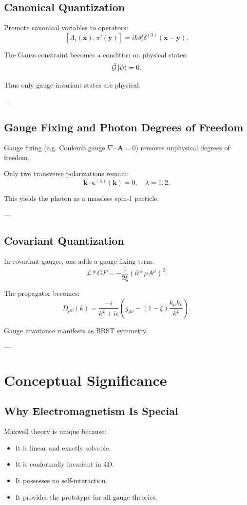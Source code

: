 \documentclass[12pt]{article}
\begin{document}
\subsection{Canonical Quantization}

Promote canonical variables to operators:
\[
[A_i(\mathbf{x}), \pi^j(\mathbf{y})]
= i\hbar \delta_i^j \delta^{(3)}(\mathbf{x}-\mathbf{y}).
\]

The Gauss constraint becomes a condition on physical states:
\[
\hat{\mathcal{G}} \ket{\psi} = 0.
\]

Thus only gauge-invariant states are physical.

---

\subsection{Gauge Fixing and Photon Degrees of Freedom}

Gauge fixing (e.g. Coulomb gauge $ \nabla \cdot \mathbf{A} = 0 $) removes unphysical degrees of freedom.

Only two transverse polarizations remain:
\[
\mathbf{k} \cdot \boldsymbol{\epsilon}^{(\lambda)}(\mathbf{k}) = 0,
\quad \lambda = 1,2.
\]

This yields the photon as a massless spin-1 particle.

---

\subsection{Covariant Quantization}

In covariant gauges, one adds a gauge-fixing term:
\[
\mathcal{L}*{GF} = -\frac{1}{2\xi} (\partial*\mu A^\mu)^2.
\]

The propagator becomes:
\[
D_{\mu\nu}(k) =
\frac{-i}{k^2 + i\epsilon}
\left(
g_{\mu\nu} - (1 - \xi)\frac{k_\mu k_\nu}{k^2}
\right).
\]

Gauge invariance manifests as BRST symmetry.

---

\section{Conceptual Significance}

\subsection{Why Electromagnetism Is Special}

Maxwell theory is unique because:
\begin{itemize}
\item It is linear and exactly solvable.
\item It is conformally invariant in 4D.
\item It possesses no self-interaction.
\item It provides the prototype for all gauge theories.
\end{itemize}
\end{document}
